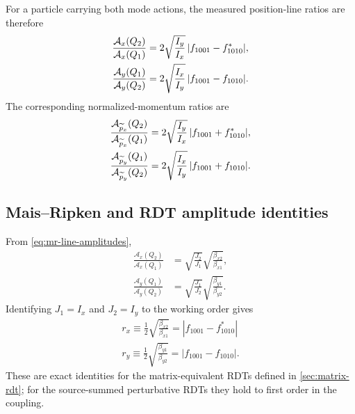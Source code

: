 For a particle carrying both mode actions, the measured position-line ratios are therefore
\begin{align}
 \frac{\mathcal A_x(Q_2)}{\mathcal A_x(Q_1)}
 &=2\sqrt{\frac{I_y}{I_x}}\,|f_{1001}-f_{1010}^{*}|,
 \label{eq:measured-x-rdt-ratio}\\
 \frac{\mathcal A_y(Q_1)}{\mathcal A_y(Q_2)}
 &=2\sqrt{\frac{I_x}{I_y}}\,|f_{1001}-f_{1010}|.
 \label{eq:measured-y-rdt-ratio}
\end{align}
The corresponding normalized-momentum ratios are
\begin{align}
 \frac{\mathcal A_{\widetilde p_x}(Q_2)}{\mathcal A_{\widetilde p_x}(Q_1)}
 &=2\sqrt{\frac{I_y}{I_x}}\,|f_{1001}+f_{1010}^{*}|,
 \label{eq:measured-px-rdt-ratio}\\
 \frac{\mathcal A_{\widetilde p_y}(Q_1)}{\mathcal A_{\widetilde p_y}(Q_2)}
 &=2\sqrt{\frac{I_x}{I_y}}\,|f_{1001}+f_{1010}|.
 \label{eq:measured-py-rdt-ratio}
\end{align}

\subsection{Mais--Ripken and RDT amplitude identities}

From \cref{eq:mr-line-amplitudes},
\begin{align}
 \frac{\mathcal A_x(Q_2)}{\mathcal A_x(Q_1)}
 &=\sqrt{\frac{J_2}{J_1}}
   \sqrt{\frac{\beta_{x2}}{\beta_{x1}}},\\
 \frac{\mathcal A_y(Q_1)}{\mathcal A_y(Q_2)}
 &=\sqrt{\frac{J_1}{J_2}}
   \sqrt{\frac{\beta_{y1}}{\beta_{y2}}}.
\end{align}
Identifying $J_1=I_x$ and $J_2=I_y$ to the working order gives
\begin{align}
 \boxed{
 r_x\equiv\frac12\sqrt{\frac{\beta_{x2}}{\beta_{x1}}}
 =|f_{1001}-f_{1010}^{*}|
 }
 \label{eq:rx-main}\\
 \boxed{
 r_y\equiv\frac12\sqrt{\frac{\beta_{y1}}{\beta_{y2}}}
 =|f_{1001}-f_{1010}|
 .}
 \label{eq:ry-main}
\end{align}
These are exact identities for the matrix-equivalent RDTs defined in \cref{sec:matrix-rdt}; for the source-summed perturbative RDTs they hold to first order in the coupling.

